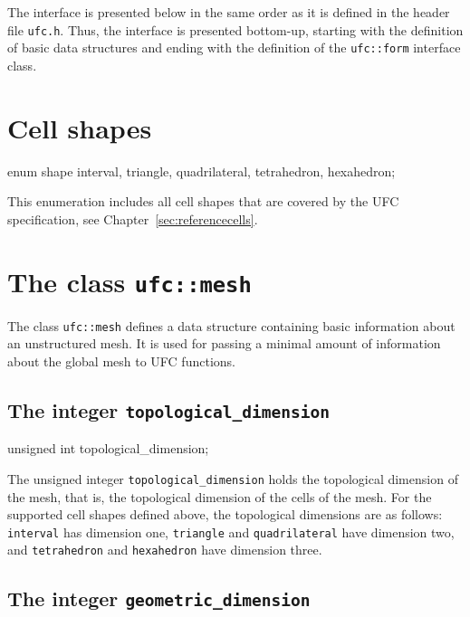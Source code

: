 The interface is presented below in the same order as it is
defined in the header file \texttt{ufc.h}. Thus, the interface is
presented bottom-up, starting with the definition of basic data
structures and ending with the definition of the \texttt{ufc::form}
interface class.

\section{Cell shapes}

\begin{code}
enum shape {interval,
            triangle,
            quadrilateral,
            tetrahedron,
            hexahedron};
\end{code}

This enumeration includes all cell shapes that are covered by the UFC
specification, see Chapter~\ref{sec:referencecells}.

\section{The class \texttt{ufc::mesh}}

The class \texttt{ufc::mesh} defines a data structure containing basic
information about an unstructured mesh. It is used for passing a
minimal amount of information about the global mesh to UFC functions.

\subsection{The integer \texttt{topological\_dimension}}

\begin{code}
unsigned int topological_dimension;
\end{code}

The unsigned integer \texttt{topological\_dimension} holds the
topological dimension of the mesh, that is, the topological dimension
of the cells of the mesh. For the supported cell shapes defined above,
the topological dimensions are as follows: \texttt{interval} has
dimension one, \texttt{triangle} and \texttt{quadri\-lateral} have
dimension two, and \texttt{tetrahedron} and \texttt{hexahedron} have
dimension three.

\subsection{The integer \texttt{geometric\_dimension}}

